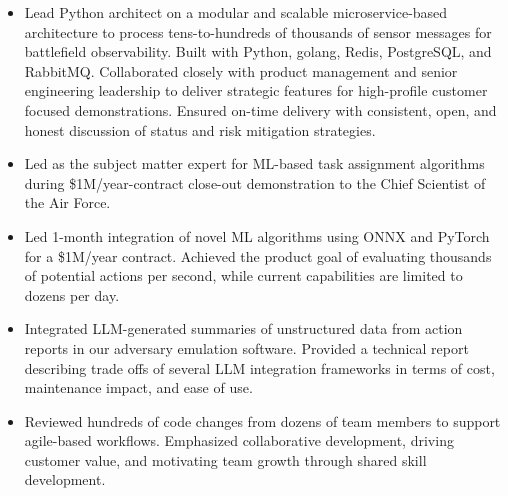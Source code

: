 \begin{itemize}
\item Lead Python architect on a modular and scalable microservice-based architecture to process tens-to-hundreds of thousands of sensor messages for battlefield observability. Built with Python, golang, Redis, PostgreSQL, and RabbitMQ. Collaborated closely with product management and senior engineering leadership to deliver strategic features for high-profile customer focused demonstrations. Ensured on-time delivery with consistent, open, and honest discussion of status and risk mitigation strategies.
\item Led as the subject matter expert for ML-based task assignment algorithms during \$1M/year-contract close-out demonstration to the Chief Scientist of the Air Force.
\item Led 1-month integration of novel ML algorithms using ONNX and PyTorch for a \$1M/year contract. Achieved the product goal of evaluating thousands of potential actions per second, while current capabilities are limited to dozens per day.
\item Integrated LLM-generated summaries of unstructured data from action reports in our adversary emulation software. Provided a technical report describing trade offs of several LLM integration frameworks in terms of cost, maintenance impact, and ease of use.
\item Reviewed hundreds of code changes from dozens of team members to support agile-based workflows. Emphasized collaborative development, driving customer value, and motivating team growth through shared skill development.
\end{itemize}
\sectionsep

